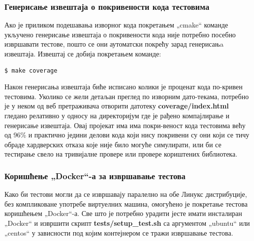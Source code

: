 \documentclass[a4paper, 12pt, diplomski]{etfcyr}
\def\quote#1{„#1“}
\begin{document}
				\subsubsection*{Генерисање извештаја о покривености кода тестовима}
					\begin{justify}
						Ако је приликом подешавања изворног кода покретањем \quote{cmake} команде укључено генерисање извештаја о покривености кода није потребно посебно извршавати тестове, пошто се они аутоматски покрећу зарад генерисањa извештаја. Извештај се добија покретањем команде:
						\begin{footnotesize}
							\begin{verbatim}
$ make coverage
							\end{verbatim}
						\end{footnotesize}
						Након генерисања извештаја биће исписано колики је проценат кода по-кривен тестовима. Уколико се жели детаљан преглед по изворним дато-текама, потребно је у неком од веб претраживача отворити датотеку \textbf{coverage/index.html} гледано релативно у односу на директоријум где је рађено компајлирање и генерисање извештаја. Овај пројекат има има покри-веност кода тестовима већу од 96\% и практично једини делови кода који нису покривени су они који се тичу обраде хардверских отказа које није било могуће симулирати, или би се тестирање свело на тривијалне провере или провере кориштених библиотека.
					\end{justify}

				\subsubsection{Коришћење \quote{Docker}-а за извршавање тестова}
					\begin{justify}
						Како би тестови могли да се извршавају паралелно на обе Линукс дистрибуције, без компликоване употребе виртуелних машина, омогућено је покретање тестова коришћењем \quote{Docker}-а. Све што је потребно урадити јесте имати инсталиран \quote{Docker} и извршити скрипт \textbf{tests/setup\_test.sh} са аргументом \quote{ubuntu} или \quote{centos} у зависности под којим контејнером се тражи извршавање тестова.
					\end{justify}
					
\end{document}
